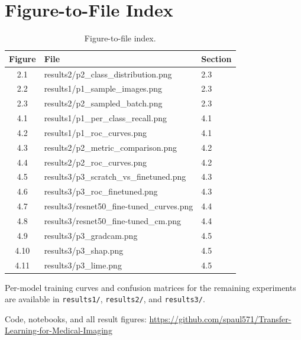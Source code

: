 \documentclass[11pt,a4paper]{article}
\numberwithin{figure}{section}
\numberwithin{table}{section}
\let\oldsection\section
\renewcommand{\section}{\clearpage\oldsection}
\begin{document}
\section{Figure-to-File Index}
\begin{table}[H]
\centering
\caption{Figure-to-file index.}
\label{tab:appB}
\begin{tabular}{cll}
\toprule
Figure & File & Section \\
\midrule
2.1 & results2/p2\_class\_distribution.png & 2.3 \\
2.2 & results1/p1\_sample\_images.png & 2.3 \\
2.3 & results2/p2\_sampled\_batch.png & 2.3 \\
4.1 & results1/p1\_per\_class\_recall.png & 4.1 \\
4.2 & results1/p1\_roc\_curves.png & 4.1 \\
4.3 & results2/p2\_metric\_comparison.png & 4.2 \\
4.4 & results2/p2\_roc\_curves.png & 4.2 \\
4.5 & results3/p3\_scratch\_vs\_finetuned.png & 4.3 \\
4.6 & results3/p3\_roc\_finetuned.png & 4.3 \\
4.7 & results3/resnet50\_fine-tuned\_curves.png & 4.4 \\
4.8 & results3/resnet50\_fine-tuned\_cm.png & 4.4 \\
4.9 & results3/p3\_gradcam.png & 4.5 \\
4.10 & results3/p3\_shap.png & 4.5 \\
4.11 & results3/p3\_lime.png & 4.5 \\
\bottomrule
\end{tabular}
\end{table}
Per-model training curves and confusion matrices for the remaining experiments are available in
\texttt{results1/}, \texttt{results2/}, and \texttt{results3/}.

\vspace{1.0cm}
\begin{center}
{\small Code, notebooks, and all result figures:
\textcolor{blue}{\url{https://github.com/spaul571/Transfer-Learning-for-Medical-Imaging}}\par}
\end{center}
\end{document}
